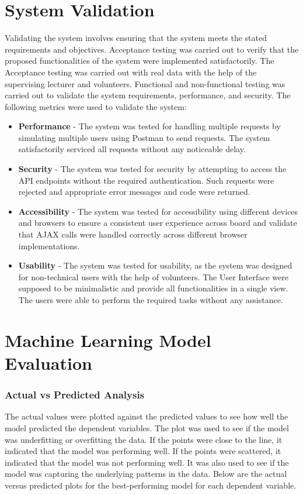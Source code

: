 \section{System Validation}

Validating the system involves ensuring that the system meets the stated requirements and objectives. Acceptance testing was carried out to verify that the 
proposed functionalities of the system were implemented satisfactorily. The Acceptance testing was carried out with real data with the help of the supervising
lecturer and volunteers. Functional and non-functional testing was carried out to validate the system requirements, performance, and security. 
The following metrics were used to validate the system: 
\begin{itemize}
    \item \textbf{Performance} - The system was tested for handling multiple requests by simulating multiple users using Postman to send requests. The system satisfactorily
    serviced all requests without any noticeable delay. 
    \item \textbf{Security} - The system was tested for security by attempting to access the API endpoints without the required authentication. Such requests were rejected
    and appropriate error messages and code were returned. 
    \item \textbf{Accessibility} - The system was tested for accessibility using different devices and browsers to ensure a consistent user experience across board and
    validate that AJAX calls were handled correctly across different browser implementations. 
    \item \textbf{Usability} - The system was tested for usability, as the system was designed for non-technical users with the help of volunteers. The User
    Interface were supposed to be minimalistic and provide all functionalities in a single view. The users were able to perform the required tasks without any assistance.
\end{itemize}

\section{Machine Learning Model Evaluation}

\subsubsection{Actual vs Predicted Analysis}
The actual values were plotted against the predicted values to see how well the model predicted the
dependent variables. The plot was used to see if the model was underfitting or overfitting the data. If the points were close to the line, it indicated that the model was performing well.
If the points were scattered, it indicated that the model was not performing well. It was also used to see if the model was capturing the underlying patterns in the data. Below are the
actual versus predicted plots for the best-performing model for each dependent variable.

